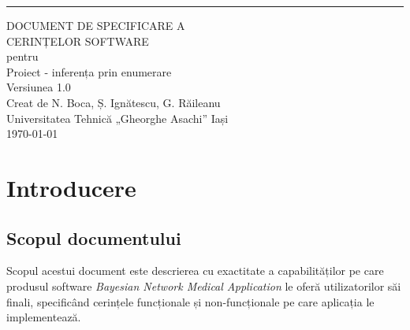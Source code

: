 \documentclass{scrreprt}
\date{}
\def\myversion{1.0 }
\begin{document}
\begin{flushright}
    \rule{16cm}{5pt}\vskip1cm
    \begin{bfseries}
        \Huge{DOCUMENT DE SPECIFICARE A\\CERINȚELOR SOFTWARE}\\
        \vspace{1.7cm}
        pentru\\
        \vspace{1.7cm}
        Proiect - inferența prin enumerare\\
        \vspace{1.7cm}
        \LARGE{Versiunea \myversion}\\
        \vspace{1.7cm}
        Creat de N. Boca, Ș. Ignătescu, G. Răileanu\\
        \vspace{1.7cm}
        Universitatea Tehnică „Gheorghe Asachi” Iași\\
        \vspace{1.7cm}
        \today\\
    \end{bfseries}
\end{flushright}

\tableofcontents


\chapter{Introducere}

\section{Scopul documentului}
Scopul acestui document este descrierea cu exactitate a capabilităților pe care produsul software \textit{Bayesian Network Medical Application} le oferă utilizatorilor săi finali, specificând cerințele funcționale și non-funcționale pe care aplicația le implementează.
\end{document}
